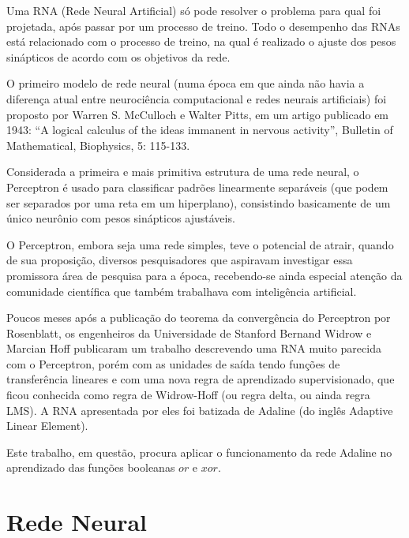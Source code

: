 \documentclass[a4paper,11pt]{article}
\begin{document}
		Uma RNA (Rede Neural Artificial) só pode resolver o problema para qual foi projetada, após passar por um processo de treino. Todo o desempenho das RNAs está relacionado com o processo de treino, na qual é realizado o ajuste dos pesos sinápticos de acordo com os objetivos da rede.
		
		O primeiro modelo de rede neural (numa época em que ainda não havia a diferença atual entre neurociência computacional e redes neurais artificiais) foi proposto por Warren S. McCulloch e Walter Pitts, em um artigo publicado em 1943: “A logical calculus of the ideas immanent in nervous activity”, Bulletin of Mathematical, Biophysics, 5: 115-133.
		
		Considerada a primeira e mais primitiva estrutura de uma rede neural, o Perceptron é usado para classificar padrões linearmente separáveis (que podem ser separados por uma reta em um hiperplano), consistindo basicamente de um único neurônio com pesos sinápticos ajustáveis. 
		
		O Perceptron, embora seja uma rede simples, teve o potencial de atrair, quando de sua proposição, diversos pesquisadores que aspiravam investigar essa promissora área de pesquisa para a época, recebendo-se ainda especial atenção da comunidade científica que também trabalhava com inteligência artificial. \cite{RedesNeuraisIvanNunes}
		
		Poucos meses após a publicação do teorema da convergência do Perceptron por Rosenblatt, os engenheiros da Universidade de Stanford Bernand Widrow e Marcian Hoff publicaram um trabalho descrevendo uma RNA muito parecida com o Perceptron, porém com as unidades de saída tendo funções de transferência lineares e com uma nova regra de aprendizado supervisionado, que ficou conhecida como regra de Widrow-Hoff (ou regra delta, ou ainda regra LMS). A RNA apresentada por eles foi batizada de Adaline (do inglês Adaptive Linear Element).
		
		Este trabalho, em questão, procura aplicar o funcionamento da rede Adaline no aprendizado das funções booleanas $or$ e $xor$.
		
	\section{Rede Neural}
	
\end{document}
